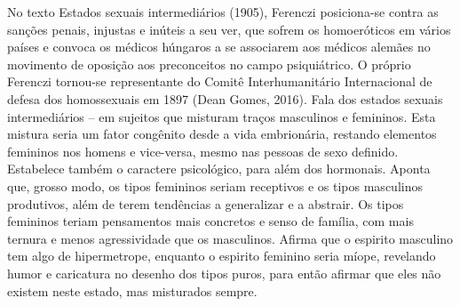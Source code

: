 No texto Estados sexuais intermediários (1905), Ferenczi posiciona-se
contra as sanções penais, injustas e inúteis a seu ver, que sofrem os
homoeróticos em vários países e convoca os médicos húngaros a se
associarem aos médicos alemães no movimento de oposição aos preconceitos
no campo psiquiátrico. O próprio Ferenczi tornou-se representante do
Comitê Interhumanitário Internacional de defesa dos homossexuais em 1897
(Dean Gomes, 2016). Fala dos estados sexuais intermediários -- em
sujeitos que misturam traços masculinos e femininos. Esta mistura seria
um fator congênito desde a vida embrionária, restando elementos
femininos nos homens e vice-versa, mesmo nas pessoas de sexo definido.
Estabelece também o caractere psicológico, para além dos hormonais.
Aponta que, grosso modo, os tipos femininos seriam receptivos e os tipos
masculinos produtivos, além de terem tendências a generalizar e a
abstrair. Os tipos femininos teriam pensamentos mais concretos e senso
de família, com mais ternura e menos agressividade que os masculinos.
Afirma que o espirito masculino tem algo de hipermetrope, enquanto o
espirito feminino seria míope, revelando humor e caricatura no desenho
dos tipos puros, para então afirmar que eles não existem neste estado,
mas misturados sempre.

